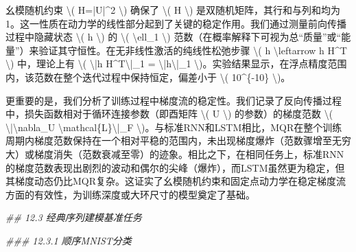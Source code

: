 \documentclass[
  12pt,
]{article}
\newenvironment{Shaded}{}{}
\newcommand{\CommentTok}[1]{\textcolor[rgb]{0.38,0.63,0.69}{\textit{#1}}}
\newcommand{\DecValTok}[1]{\textcolor[rgb]{0.25,0.63,0.44}{#1}}
\newcommand{\NormalTok}[1]{#1}
\newcommand{\OperatorTok}[1]{\textcolor[rgb]{0.40,0.40,0.40}{#1}}
\begin{document}
\begin{Shaded}
\begin{Highlighting}[]
\NormalTok{幺模随机约束 }\OperatorTok{\textbackslash{}}\NormalTok{( H}\OperatorTok{=|}\NormalTok{U}\OperatorTok{|\^{}}\DecValTok{2} \OperatorTok{\textbackslash{}}\NormalTok{) 确保了 }\OperatorTok{\textbackslash{}}\NormalTok{( H }\OperatorTok{\textbackslash{}}\NormalTok{) 是双随机矩阵，其行和与列和均为}\DecValTok{1}\NormalTok{。这一性质在动力学的线性部分起到了关键的稳定作用。我们通过测量前向传播过程中隐藏状态 }\OperatorTok{\textbackslash{}}\NormalTok{( h }\OperatorTok{\textbackslash{}}\NormalTok{) 的 }\OperatorTok{\textbackslash{}}\NormalTok{( }\OperatorTok{\textbackslash{}}\NormalTok{ell\_1 }\OperatorTok{\textbackslash{}}\NormalTok{) 范数（在概率解释下可视为总“质量”或“能量”）来验证其守恒性。在无非线性激活的纯线性松弛步骤 }\OperatorTok{\textbackslash{}}\NormalTok{( h }\OperatorTok{\textbackslash{}}\NormalTok{leftarrow h H}\OperatorTok{\^{}}\NormalTok{T }\OperatorTok{\textbackslash{}}\NormalTok{) 中，理论上有 }\OperatorTok{\textbackslash{}}\NormalTok{( }\OperatorTok{\textbackslash{}|}\NormalTok{h H}\OperatorTok{\^{}}\NormalTok{T}\OperatorTok{\textbackslash{}|}\NormalTok{\_}\DecValTok{1} \OperatorTok{=} \OperatorTok{\textbackslash{}|}\NormalTok{h}\OperatorTok{\textbackslash{}|}\NormalTok{\_}\DecValTok{1} \OperatorTok{\textbackslash{}}\NormalTok{)。实验结果显示，在浮点精度范围内，该范数在整个迭代过程中保持恒定，偏差小于 }\OperatorTok{\textbackslash{}}\NormalTok{( }\DecValTok{10}\OperatorTok{\^{}}\NormalTok{\{}\OperatorTok{{-}}\DecValTok{10}\NormalTok{\} }\OperatorTok{\textbackslash{}}\NormalTok{)。}

\NormalTok{更重要的是，我们分析了训练过程中梯度流的稳定性。我们记录了反向传播过程中，损失函数相对于循环连接参数（即酉矩阵 }\OperatorTok{\textbackslash{}}\NormalTok{( U }\OperatorTok{\textbackslash{}}\NormalTok{) 的参数）的梯度范数 }\OperatorTok{\textbackslash{}}\NormalTok{( }\OperatorTok{\textbackslash{}|\textbackslash{}}\NormalTok{nabla\_U }\OperatorTok{\textbackslash{}}\NormalTok{mathcal\{L\}}\OperatorTok{\textbackslash{}|}\NormalTok{\_F }\OperatorTok{\textbackslash{}}\NormalTok{)。与标准RNN和LSTM相比，MQR在整个训练周期内梯度范数保持在一个相对平稳的范围内，未出现梯度爆炸（范数骤增至无穷大）或梯度消失（范数衰减至零）的迹象。相比之下，在相同任务上，标准RNN的梯度范数表现出剧烈的波动和偶尔的尖峰（爆炸），而LSTM虽然更为稳定，但其梯度动态仍比MQR复杂。这证实了幺模随机约束和固定点动力学在稳定梯度流方面的有效性，为训练深度或大环尺寸的模型奠定了基础。}

\CommentTok{\#\# 12.3 经典序列建模基准任务}

\CommentTok{\#\#\# 12.3.1 顺序MNIST分类}


\end{Highlighting}
\end{Shaded}
\end{document}
